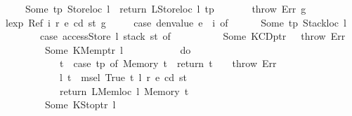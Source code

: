\begin{isabellebody}
\ \ \ \ {\isacharbar}{\kern0pt}\ Some\ {\isacharparenleft}{\kern0pt}tp{\isacharcomma}{\kern0pt}\ {\isacharparenleft}{\kern0pt}Storeloc\ l{\isacharparenright}{\kern0pt}{\isacharparenright}{\kern0pt}\ {\isasymRightarrow}\ return\ {\isacharparenleft}{\kern0pt}LStoreloc\ l{\isacharcomma}{\kern0pt}\ tp{\isacharparenright}{\kern0pt}\isanewline
\ \ \ \ {\isacharbar}{\kern0pt}\ {\isacharunderscore}{\kern0pt}\ {\isasymRightarrow}\ throw\ Err{\isacharparenright}{\kern0pt}\ g{\isachardoublequoteclose}\isanewline
{\isacharbar}{\kern0pt}\ {\isachardoublequoteopen}lexp\ {\isacharparenleft}{\kern0pt}Ref\ i\ r{\isacharparenright}{\kern0pt}\ e\ cd\ st\ g\ {\isacharequal}{\kern0pt}\isanewline
\ \ \ \ {\isacharparenleft}{\kern0pt}case\ {\isacharparenleft}{\kern0pt}denvalue\ e{\isacharparenright}{\kern0pt}\ {\isachardollar}{\kern0pt}{\isachardollar}{\kern0pt}\ i\ of\isanewline
\ \ \ \ \ \ Some\ {\isacharparenleft}{\kern0pt}tp{\isacharcomma}{\kern0pt}\ Stackloc\ l{\isacharparenright}{\kern0pt}\ {\isasymRightarrow}\isanewline
\ \ \ \ \ \ \ \ {\isacharparenleft}{\kern0pt}case\ accessStore\ l\ {\isacharparenleft}{\kern0pt}stack\ st{\isacharparenright}{\kern0pt}\ of\isanewline
\ \ \ \ \ \ \ \ \ \ Some\ {\isacharparenleft}{\kern0pt}KCDptr\ {\isacharunderscore}{\kern0pt}{\isacharparenright}{\kern0pt}\ {\isasymRightarrow}\ throw\ Err\isanewline
\ \ \ \ \ \ \ \ {\isacharbar}{\kern0pt}\ Some\ {\isacharparenleft}{\kern0pt}KMemptr\ l{\isacharprime}{\kern0pt}{\isacharparenright}{\kern0pt}\ {\isasymRightarrow}\isanewline
\ \ \ \ \ \ \ \ \ \ do\ {\isacharbraceleft}{\kern0pt}\isanewline
\ \ \ \ \ \ \ \ \ \ \ \ t\ {\isasymleftarrow}\ {\isacharparenleft}{\kern0pt}case\ tp\ of\ Memory\ t\ {\isasymRightarrow}\ return\ t\ {\isacharbar}{\kern0pt}\ {\isacharunderscore}{\kern0pt}\ {\isasymRightarrow}\ throw\ Err{\isacharparenright}{\kern0pt}{\isacharsemicolon}{\kern0pt}\isanewline
\ \ \ \ \ \ \ \ \ \ \ \ {\isacharparenleft}{\kern0pt}l{\isacharprime}{\kern0pt}{\isacharprime}{\kern0pt}{\isacharcomma}{\kern0pt}\ t{\isacharprime}{\kern0pt}{\isacharparenright}{\kern0pt}\ {\isasymleftarrow}\ msel\ True\ t\ l{\isacharprime}{\kern0pt}\ r\ e\ cd\ st{\isacharsemicolon}{\kern0pt}\isanewline
\ \ \ \ \ \ \ \ \ \ \ \ return\ {\isacharparenleft}{\kern0pt}LMemloc\ l{\isacharprime}{\kern0pt}{\isacharprime}{\kern0pt}{\isacharcomma}{\kern0pt}\ Memory\ t{\isacharprime}{\kern0pt}{\isacharparenright}{\kern0pt}\isanewline
\ \ \ \ \ \ \ \ \ \ {\isacharbraceright}{\kern0pt}\isanewline
\ \ \ \ \ \ \ \ {\isacharbar}{\kern0pt}\ Some\ {\isacharparenleft}{\kern0pt}KStoptr\ l{\isacharprime}{\kern0pt}{\isacharparenright}{\kern0pt}\ {\isasymRightarrow}\isanewline

\end{isabellebody}
